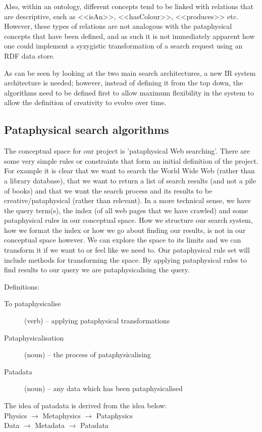 Also, within an ontology, different concepts tend to be linked with relations that are descriptive, such as <<isAn>>, <<hasColour>>, <<produces>> etc. However, these types of relations are not analogous with the pataphysical concepts that have been defined, and as such it is not immediately apparent how one could implement a syzygistic transformation of a search request using an RDF data store.

As can be seen by looking at the two main search architectures, a new IR system architecture is needed; however, instead of defining it from the top down, the algorithms need to be defined first to allow maximum flexibility in the system to allow the definition of creativity to evolve over time.

\subsection{Pataphysical search algorithms}

The conceptual space for our project is 'pataphysical Web searching'. There are some very simple rules or constraints that form an initial definition of the project. For example it is clear that we want to search the World Wide Web (rather than a library database), that we want to return a list of search results (and not a pile of books) and that we want the search process and its results to be creative/pataphysical (rather than relevant).  In a more technical sense, we have the query term(s), the index (of all web pages that we have crawled) and some pataphysical rules in our conceptual space. How we structure our search system, how we format the index or how we go about finding our results, is not in our conceptual space however. We can explore the space to its limits and we can transform it if we want to or feel like we need to. Our pataphysical rule set will include methods for transforming the space. By applying pataphysical rules to find results to our query we are pataphysicalising the query.

Definitions:
\begin{description}
\item [To pataphysicalise] (verb) – applying pataphysical transformations
\item [Pataphysicalisation] (noun) – the process of pataphysicalising
\item [Patadata] (noun) – any data which has been pataphysicalised
\end{description}

The idea of patadata is derived from the idea below:\\
Physics $\to$ Metaphysics $\to$ Pataphysics\\
Data $\to$ Metadata $\to$ Patadata


